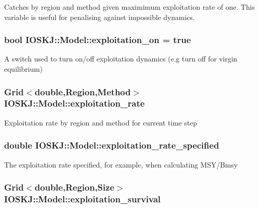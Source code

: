 Catches by region and method given maximimum exploitation rate of one. This variable is useful for penalising against impossible dynamics. \hypertarget{classIOSKJ_1_1Model_ab9afc5bae0ac8e16817802e54bdfa60d}{
\subsubsection[{exploitation\-\_\-on}]{\setlength{\rightskip}{0pt plus 5cm}bool I\-O\-S\-K\-J\-::\-Model\-::exploitation\-\_\-on = true}}\label{classIOSKJ_1_1Model_ab9afc5bae0ac8e16817802e54bdfa60d}
A switch used to turn on/off exploitation dynamics (e.\-g turn off for virgin equilibrium) \hypertarget{classIOSKJ_1_1Model_a50a15fee3ebbd10f3932e6c48f33857e}{
\subsubsection[{exploitation\-\_\-rate}]{\setlength{\rightskip}{0pt plus 5cm}Grid$<$double,Region,Method$>$ I\-O\-S\-K\-J\-::\-Model\-::exploitation\-\_\-rate}}\label{classIOSKJ_1_1Model_a50a15fee3ebbd10f3932e6c48f33857e}
Exploitation rate by region and method for current time step \hypertarget{classIOSKJ_1_1Model_a015194a0ad0bfe298215636d04cdb7f0}{
\subsubsection[{exploitation\-\_\-rate\-\_\-specified}]{\setlength{\rightskip}{0pt plus 5cm}double I\-O\-S\-K\-J\-::\-Model\-::exploitation\-\_\-rate\-\_\-specified}}\label{classIOSKJ_1_1Model_a015194a0ad0bfe298215636d04cdb7f0}
The exploitation rate specified, for example, when calculating M\-S\-Y/\-Bmsy \hypertarget{classIOSKJ_1_1Model_ab84ee0b2d5df659d730fe4c3141a7f5f}{
\subsubsection[{exploitation\-\_\-survival}]{\setlength{\rightskip}{0pt plus 5cm}Grid$<$double,Region,Size$>$ I\-O\-S\-K\-J\-::\-Model\-::exploitation\-\_\-survival}}\label{classIOSKJ_1_1Model_ab84ee0b2d5df659d730fe4c3141a7f5f}
